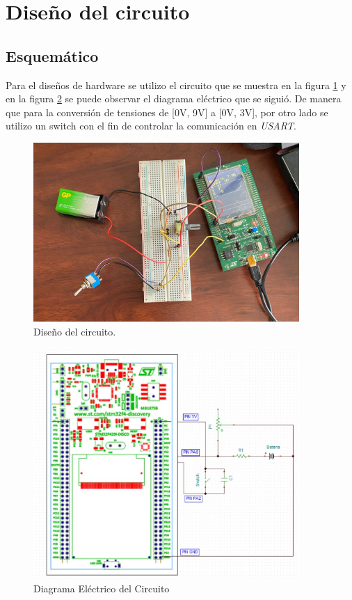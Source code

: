 \section{Diseño del circuito} 
\subsection{Esquemático}

Para el diseños de hardware se utilizo el circuito que se muestra en la figura \ref{Fig: Diseño hardware} y en la figura \ref{Fig: Diagrama_hardware} se puede observar el diagrama eléctrico que se siguió. De manera que para la conversión de tensiones de [0V, 9V] a [0V, 3V], por otro lado se utilizo un switch con el fin de controlar la comunicación en \textit{USART}.

\begin{figure}[H]
\centering
\includegraphics[width=0.9\textwidth]{Imagenes/Circuito.jpg} 
\caption{Diseño del circuito.}
\label{Fig: Diseño hardware}
\end{figure}

\begin{figure}[H]
\centering
\includegraphics[width=0.9\textwidth]{Imagenes/Diagrama_electricoLab4.jpg} 
\caption{Diagrama Eléctrico del Circuito}
\label{Fig: Diagrama_hardware}
\end{figure}


